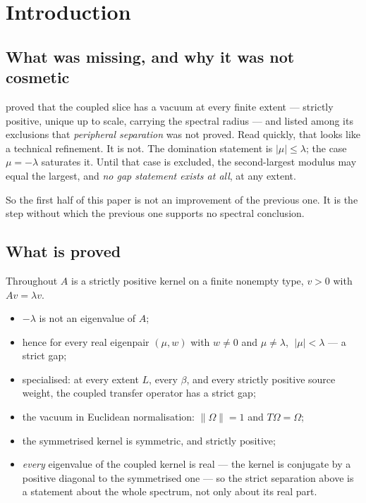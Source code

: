 \documentclass[11pt]{article}
\theoremstyle{definition}
\newcommand{\Om}{\Omega}
\begin{document}
\section{Introduction}

\subsection{What was missing, and why it was not cosmetic}

\cite{ErikssonPerron} proved that the coupled slice has a vacuum at every finite
extent --- strictly positive, unique up to scale, carrying the spectral radius
--- and listed among its exclusions that \emph{peripheral separation} was not
proved.  Read quickly, that looks like a technical refinement.  It is not.  The
domination statement is $|\mu|\le\lambda$; the case $\mu=-\lambda$ saturates it.
Until that case is excluded, the second-largest modulus may equal the largest,
and \emph{no gap statement exists at all}, at any extent.

So the first half of this paper is not an improvement of the previous one.  It
is the step without which the previous one supports no spectral conclusion.

\subsection{What is proved}

Throughout $A$ is a strictly positive kernel on a finite nonempty type, $v>0$
with $Av=\lambda v$.

\begin{itemize}
\item $-\lambda$ is not an eigenvalue of $A$;
\item hence for every real eigenpair $(\mu,w)$ with $w\neq0$ and $\mu\neq\lambda$,
      $\;|\mu|<\lambda$ --- a strict gap;
\item specialised: at every extent $L$, every $\beta$, and every strictly
      positive source weight, the coupled transfer operator has a strict gap;
\item the vacuum in Euclidean normalisation: $\|\Om\|=1$ and $T\Om=\Om$;
\item the symmetrised kernel is symmetric, and strictly positive;
\item \emph{every} eigenvalue of the coupled kernel is real --- the kernel is
      conjugate by a positive diagonal to the symmetrised one --- so the strict
      separation above is a statement about the whole spectrum, not only about
      its real part.
\end{itemize}
\end{document}
